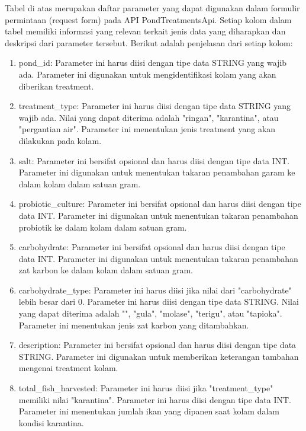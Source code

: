 \begin{enumerate}[1.]
Tabel di atas merupakan daftar parameter yang dapat digunakan dalam formulir permintaan (request form) pada API PondTreatmentsApi. Setiap kolom dalam tabel memiliki informasi yang relevan terkait jenis data yang diharapkan dan deskripsi dari parameter tersebut. Berikut adalah penjelasan dari setiap kolom:

\begin{enumerate}
\item pond\_id: Parameter ini harus diisi dengan tipe data STRING yang wajib ada. Parameter ini digunakan untuk mengidentifikasi kolam yang akan diberikan treatment.

\item treatment\_type: Parameter ini harus diisi dengan tipe data STRING yang wajib ada. Nilai yang dapat diterima adalah "ringan", "karantina", atau "pergantian air". Parameter ini menentukan jenis treatment yang akan dilakukan pada kolam.

\item salt: Parameter ini bersifat opsional dan harus diisi dengan tipe data INT. Parameter ini digunakan untuk menentukan takaran penambahan garam ke dalam kolam dalam satuan gram.

\item probiotic\_culture: Parameter ini bersifat opsional dan harus diisi dengan tipe data INT. Parameter ini digunakan untuk menentukan takaran penambahan probiotik ke dalam kolam dalam satuan gram.

\item carbohydrate: Parameter ini bersifat opsional dan harus diisi dengan tipe data INT. Parameter ini digunakan untuk menentukan takaran penambahan zat karbon ke dalam kolam dalam satuan gram.

\item carbohydrate\_type: Parameter ini harus diisi jika nilai dari "carbohydrate" lebih besar dari 0. Parameter ini harus diisi dengan tipe data STRING. Nilai yang dapat diterima adalah "", "gula", "molase", "terigu", atau "tapioka". Parameter ini menentukan jenis zat karbon yang ditambahkan.

\item description: Parameter ini bersifat opsional dan harus diisi dengan tipe data STRING. Parameter ini digunakan untuk memberikan keterangan tambahan mengenai treatment kolam.

\item total\_fish\_harvested: Parameter ini harus diisi jika "treatment\_type" memiliki nilai "karantina". Parameter ini harus diisi dengan tipe data INT. Parameter ini menentukan jumlah ikan yang dipanen saat kolam dalam kondisi karantina.


\end{enumerate}
\end{enumerate}
